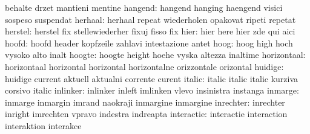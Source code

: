                            behalte                   drzet
                           mantieni                  mentine
                  hangend: hangend                   hanging
                           haengend                  visici
                           sospeso                   suspendat
                  herhaal: herhaal                   repeat
                           wiederholen               opakovat
                           ripeti                    repetat
                  herstel: herstel                   fix
                           stellewiederher           fixuj
                           fisso                     fix
                     hier: hier                      here
                           hier                      zde
                           qui                       aici
                    hoofd: hoofd                     header
                           kopfzeile                 zahlavi
                           intestazione              antet
                     hoog: hoog                      high
                           hoch                      vysoko
                           alto                      inalt
                   hoogte: hoogte                    height
                           hoehe                     vyska
                           altezza                   inaltime
              horizontaal: horizontaal               horizontal
                           horizontal                horizontalne
                           orizzontale               orizontal
                  huidige: huidige                   current
                           aktuell                   aktualni
                           corrente                  curent
                   italic: italic                    italic
                           italic                    kurziva
                           corsivo                   italic
                 inlinker: inlinker                  inleft
                           imlinken                  vlevo
                           insinistra                instanga
                  inmarge: inmarge                   inmargin
                           imrand                    naokraji
                           inmargine                 inmargine
                inrechter: inrechter                 inright
                           imrechten                 vpravo
                           indestra                  indreapta
               interactie: interactie                interaction
                           interaktion               interakce
